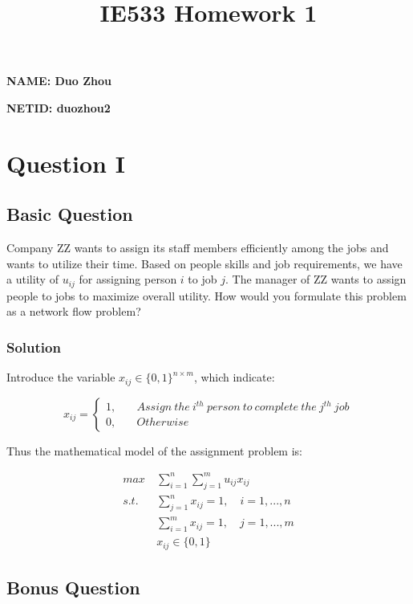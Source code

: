 \documentclass[11pt]{article}
\title{IE533 Homework 1}
\begin{document}
    
    \maketitle
    
    

    
    \textbf{NAME: Duo Zhou}

\textbf{NETID: duozhou2}

    \hypertarget{question-i}{%
\section{Question I}\label{question-i}}

\hypertarget{basic-question}{%
\subsection{Basic Question}\label{basic-question}}

Company ZZ wants to assign its staff members efficiently among the jobs
and wants to utilize their time. Based on people skills and job
requirements, we have a utility of \(u_{ij}\) for assigning person \(i\)
to job \(j\). The manager of ZZ wants to assign people to jobs to
maximize overall utility. How would you formulate this problem as a
network flow problem?

\hypertarget{solution}{%
\subsubsection{Solution}\label{solution}}

Introduce the variable \(x_{ij} \in \{0,1 \}^{n\times m}\), which
indicate:

\[x_{ij}=\begin{cases}1,\quad &Assign\ the\ i^{th}\ person\ to\ complete\ the\ j^{th}\ job\\0,\quad &Otherwise \end{cases}\]

Thus the mathematical model of the assignment problem is:

\[ \begin{align*} max\ & \sum_{i=1}^n \sum_{j=1}^m u_{ij} x_{ij} 
\\  s.t. & \sum_{j=1}^n x_{ij}= 1, \quad i=1,...,n
\\ & \sum_{i=1}^m x_{ij}= 1,  \quad j=1,...,m
\\ & x_{ij}\in \{0,1\} \end{align*}\]

    \hypertarget{bonus-question}{%
\subsection{Bonus Question}\label{bonus-question}}
\end{document}
